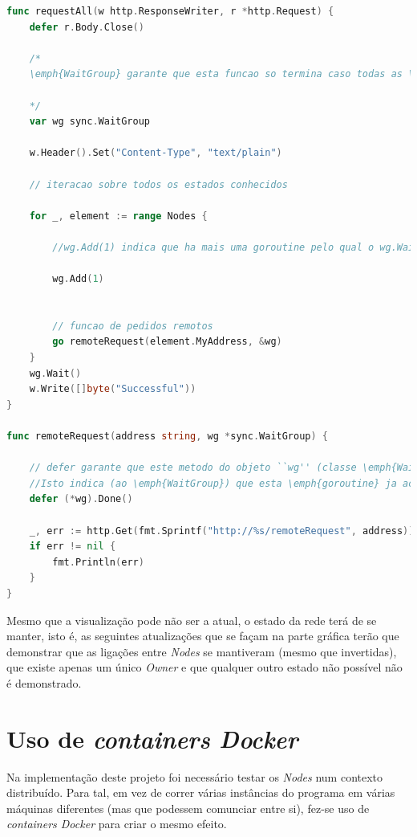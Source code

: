 \begin{lstlisting}[caption={\emph{Handler} ``requestAll'' do método ``/requestAll''},language=Go]
func requestAll(w http.ResponseWriter, r *http.Request) {
	defer r.Body.Close()

	/* 
	\emph{WaitGroup} garante que esta funcao so termina caso todas as \emph{goroutines} terminem de executar.

	*/
	var wg sync.WaitGroup

	w.Header().Set("Content-Type", "text/plain")

	// iteracao sobre todos os estados conhecidos

	for _, element := range Nodes {

		//wg.Add(1) indica que ha mais uma goroutine pelo qual o wg.Wait() precisa de esperar

		wg.Add(1)


		// funcao de pedidos remotos
		go remoteRequest(element.MyAddress, &wg)
	}
	wg.Wait()
	w.Write([]byte("Successful"))
}

func remoteRequest(address string, wg *sync.WaitGroup) {

	// defer garante que este metodo do objeto ``wg'' (classe \emph{WaitGroup}) e executado
	//Isto indica (ao \emph{WaitGroup}) que esta \emph{goroutine} ja acabou a execucao
	defer (*wg).Done()

	_, err := http.Get(fmt.Sprintf("http://%s/remoteRequest", address))
	if err != nil {
		fmt.Println(err)
	}
}

\end{lstlisting}

Mesmo que a visualização pode não ser a atual, o estado da rede terá de se manter, isto é, as seguintes 
atualizações que se façam na parte gráfica terão que demonstrar que as ligações entre \emph{Nodes} se mantiveram (mesmo que invertidas), que existe apenas um único \emph{Owner} e que qualquer outro estado não possível não é demonstrado.






\section{Uso de \emph{containers Docker}}

Na implementação deste projeto foi necessário testar os \emph{Nodes} num contexto distribuído.
Para tal, em vez de correr várias instâncias do programa em várias máquinas diferentes (mas que podessem comunciar entre si), fez-se uso de \emph{containers Docker} para criar o mesmo efeito.

